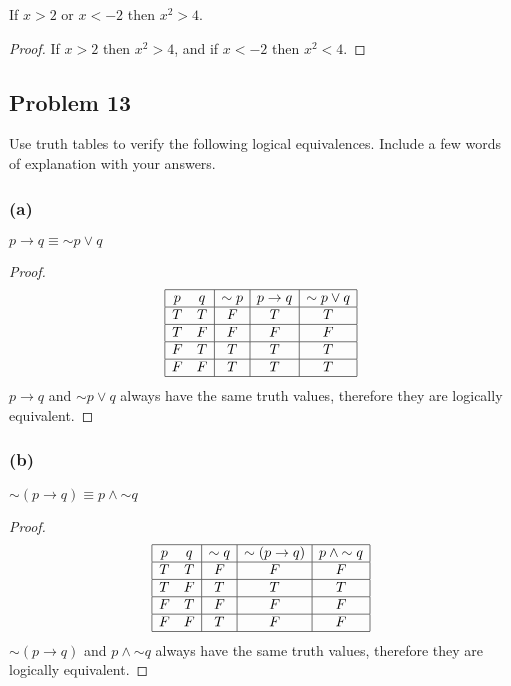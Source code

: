 \documentclass[14pt]{extarticle}
\begin{document}
\begin{center}
If $x > 2$ or $x < -2$ then $x^2 > 4$.
\end{center}

\begin{proof}
If $x > 2$ then $x^2 > 4$, and if $x < -2$ then $x^2 < 4$.
\end{proof}

\subsection{Problem 13}
Use truth tables to verify the following logical equivalences. Include a few words of explanation with your answers.

\subsubsection{(a)}
$p \to q \equiv {\sim p} \vee q$

\begin{proof}
$$
\begin{array}{|cc|c|c|c|}
\hline
p & q & {\sim p} & p \to q & {\sim p} \vee q \\
\hline
T & T & F & T & T \\
\hline
T & F & F & F & F \\
\hline
F & T & T & T & T \\
\hline
F & F & T & T & T \\
\hline
\end{array}
$$
$p \to q$ and ${\sim p} \vee q$ always have the same truth values, therefore they are logically equivalent.
\end{proof}

\subsubsection{(b)}
${\sim (p \to q)} \equiv p \wedge {\sim q}$

\begin{proof}
$$
\begin{array}{|cc|c|c|c|}
\hline
p & q & {\sim q} & {\sim (p \to q)} & p \wedge {\sim q} \\
\hline
T & T & F & F & F \\
\hline
T & F & T & T & T \\
\hline
F & T & F & F & F \\
\hline
F & F & T & F & F \\
\hline
\end{array}
$$
${\sim (p \to q)}$ and $p \wedge {\sim q}$ always have the same truth values, therefore they are logically equivalent.
\end{proof}
\end{document}
